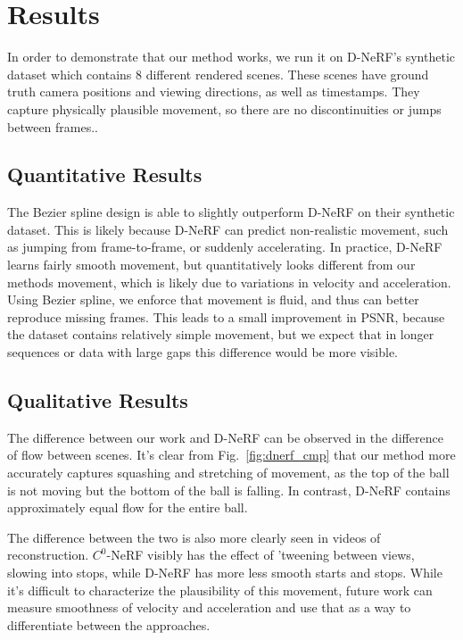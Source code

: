 \section*{Results}

In order to demonstrate that our method works, we run it on D-NeRF's synthetic
dataset which contains 8 different rendered scenes. These scenes have ground truth camera positions and viewing directions, as well as timestamps. They capture physically plausible movement, so there are no discontinuities or jumps between frames..

\subsection*{Quantitative Results}

The Bezier spline design is able to slightly outperform D-NeRF on their synthetic dataset. This is likely because D-NeRF can predict non-realistic movement, such as jumping from frame-to-frame, or suddenly accelerating. In practice, D-NeRF learns fairly smooth movement, but quantitatively looks different from our methods movement, which is likely due to variations in velocity and acceleration. Using Bezier spline, we enforce that movement is fluid, and thus can better reproduce missing frames. This leads to a small improvement in PSNR, because the dataset contains relatively simple movement, but we expect that in longer sequences or data with large gaps this difference would be more visible.

\subsection*{Qualitative Results}

The difference between our work and D-NeRF can be observed in the difference of flow between scenes. It's clear from Fig.~\ref{fig:dnerf_cmp} that our method more accurately captures squashing and stretching of movement, as the top of the ball is not moving but the bottom of the ball is falling. In contrast, D-NeRF contains approximately equal flow for the entire ball.

The difference between the two is also more clearly seen in videos of reconstruction. $C^0$-NeRF visibly has the effect of 'tweening between views, slowing into stops, while D-NeRF has more less smooth starts and stops. While it's difficult to characterize the plausibility of this movement, future work can measure smoothness of velocity and acceleration and use that as a way to differentiate between the approaches.

